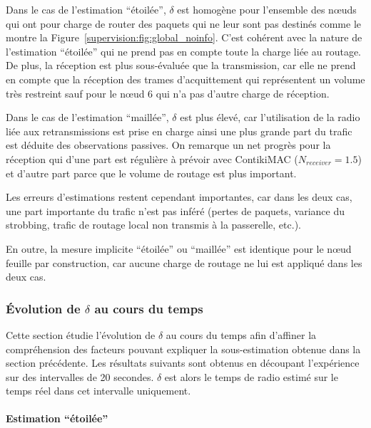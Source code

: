Dans le cas de l'estimation ``étoilée'', $\delta$ est homogène pour l'ensemble des nœuds qui ont pour charge de router des paquets qui ne leur sont pas destinés comme le montre la Figure~\ref{supervision:fig:global_noinfo}.
C'est cohérent avec la nature de l'estimation ``étoilée'' qui ne prend pas en compte toute la charge liée au routage.
De plus, la réception est plus sous-évaluée que la transmission, car elle ne prend en compte que la réception des trames d'acquittement qui représentent un volume très restreint sauf pour le nœud 6 qui n'a pas d'autre charge de réception.

Dans le cas de l'estimation ``maillée'', $\delta$ est plus élevé, car l'utilisation de la radio liée aux retransmissions est prise en charge ainsi une plus grande part du trafic est déduite des observations passives.
On remarque un net progrès pour la réception qui d'une part est régulière à prévoir avec ContikiMAC ($N_{receiver} = 1.5$) et d'autre part parce que le volume de routage est plus important.

Les erreurs d'estimations restent cependant importantes, car dans les deux cas, une part importante du trafic n'est pas inféré (pertes de paquets, variance du strobbing, trafic de routage local non transmis à la passerelle, etc.).

En outre, la mesure implicite ``étoilée'' ou ``maillée'' est identique pour le nœud feuille par construction, car aucune charge de routage ne lui est appliqué dans les deux cas.

\subsubsection{Évolution de $\delta$ au cours du temps}

Cette section étudie l'évolution de $\delta$ au cours du temps afin d'affiner la compréhension des facteurs pouvant expliquer la sous-estimation obtenue dans la section précédente.
Les résultats suivants sont obtenus en découpant l'expérience sur des intervalles de 20 secondes.
$\delta$ est alors le temps de radio estimé sur le temps réel dans cet intervalle uniquement.

\paragraph{Estimation ``étoilée''}

